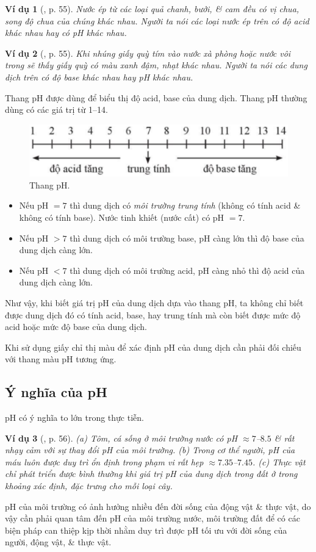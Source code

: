 \documentclass{article}
\newtheorem{vidu}{Ví dụ}
\begin{document}
\begin{vidu}[\cite{SGK_KHTN_8_Canh_Dieu}, p. 55]
	Nước ép từ các loại quả chanh, bưởi, \& cam đều có vị chua, song độ chua của chúng khác nhau. Người ta nói các loại nước ép trên có độ acid khác nhau hay có pH khác nhau.
\end{vidu}

\begin{vidu}[\cite{SGK_KHTN_8_Canh_Dieu}, p. 55]
	Khi nhúng giấy quỳ tím vào nước xà phòng hoặc nước vôi trong sẽ thấy giấy quỳ có màu xanh đậm, nhạt khác nhau. Người ta nói các dung dịch trên có độ base khác nhau hay pH khác nhau.
\end{vidu}
Thang pH được dùng để biểu thị độ acid, base của dung dịch. Thang pH thường dùng có các giá trị từ 1--14.
\begin{figure}[H]
	\centering
	\includegraphics[scale=0.25]{thang_pH}
	\caption{Thang pH.}
\end{figure}
\begin{itemize}
	\item Nếu pH $= 7$ thì dung dịch có \textit{môi trường trung tính} (không có tính acid \& không có tính base). Nước tinh khiết (nước cất) có pH $= 7$.
	\item Nếu pH $> 7$ thì dung dịch có môi trường base, pH càng lớn thì độ base của dung dịch càng lớn.
	\item Nếu pH $< 7$ thì dung dịch có môi trường acid, pH càng nhỏ thì độ acid của dung dịch càng lớn.
\end{itemize}
Như vậy, khi biết giá trị pH của dung dịch dựa vào thang pH, ta không chỉ biết được dung dịch đó có tính acid, base, hay trung tính mà còn biết được mức độ acid hoặc mức độ base của dung dịch.

Khi sử dụng giấy chỉ thị màu để xác định pH của dung dịch cần phải đối chiếu với thang màu pH tương ứng.

\subsection{Ý nghĩa của pH}
pH có ý nghĩa to lớn trong thực tiễn.

\begin{vidu}[\cite{SGK_KHTN_8_Canh_Dieu}, p. 56]
	(a) Tôm, cá sống ở môi trường nước có pH $\approx7$--$8.5$ \& rất nhạy cảm với sự thay đổi pH của môi trường. (b) Trong cơ thể người, pH của máu luôn được duy trì ổn định trong phạm vi rất hẹp $\approx7.35$--$7.45$. (c) Thực vật chỉ phát triển được bình thường khi giá trị pH của dung dịch trong đất ở trong khoảng xác định, đặc trưng cho mỗi loại cây.
\end{vidu}
pH của môi trường có ảnh hưởng nhiều đến đời sống của động vật \& thực vật, do vậy cần phải quan tâm đến pH của môi trường nước, môi trường đất để có các biện pháp can thiệp kịp thời nhằm duy trì được pH tối ưu với đời sống của người, động vật, \& thực vật.
\end{document}
